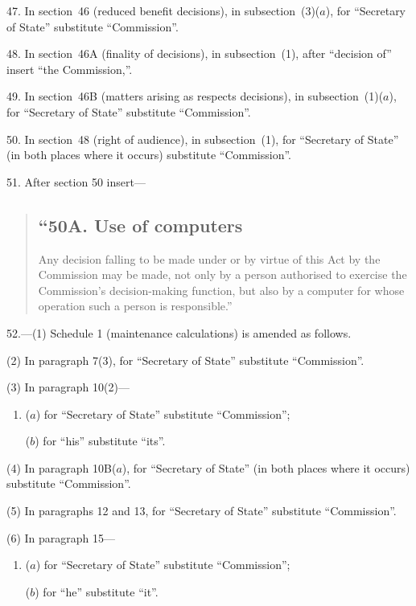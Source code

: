 \documentclass[12pt,a4paper]{article}
\begin{document}
47. In section~46 (reduced benefit decisions), in subsection~(3)($a$), for “Secretary of State” substitute “Commission”.

\medskip

48. In section~46A (finality of decisions), in subsection~(1), after “decision of” insert “the Commission,”.

\medskip

49. In section~46B (matters arising as respects decisions), in subsection~(1)($a$), for “Secretary of State” substitute “Commission”.

\medskip

50. In section~48 (right of audience), in subsection~(1), for “Secretary of State” (in both places where it occurs) substitute “Commission”.

\medskip

51. After section 50 insert—
\begin{quotation}
\subsection*{“50A. Use of computers} Any decision falling to be made under or by virtue of this Act by the Commission may be made, not only by a person authorised to exercise the Commission's decision-making function, but also by a computer for whose operation such a person is responsible.”
\end{quotation}

\medskip

52.---(1) Schedule 1 (maintenance calculations) is amended as follows.

(2) In paragraph 7(3), for “Secretary of State” substitute “Commission”.

(3) In paragraph 10(2)—
\begin{enumerate}\item[]
($a$) for “Secretary of State” substitute “Commission”;

($b$) for “his” substitute “its”.
\end{enumerate}

(4) In paragraph 10B($a$), for “Secretary of State” (in both places where it occurs) substitute “Commission”.

(5) In paragraphs 12 and 13, for “Secretary of State” substitute “Commission”.

(6) In paragraph 15—
\begin{enumerate}\item[]
($a$) for “Secretary of State” substitute “Commission”;

($b$) for “he” substitute “it”.
\end{enumerate}
\end{document}
